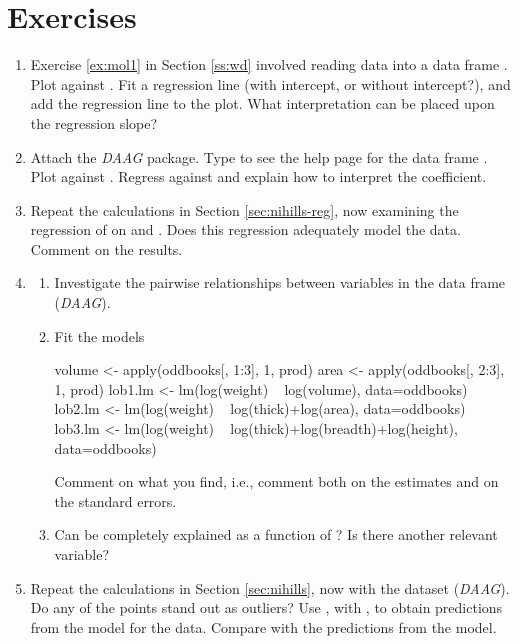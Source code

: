 \section{Exercises}
\begin{enumerate}
\item Exercise \ref{ex:mol1} in Section \ref{ss:wd} involved reading
  data into a data frame .  Plot  against
  . Fit a regression line (with intercept, or without
  intercept?), and add the regression line to the plot.  What
  interpretation can be placed upon the regression
  slope?\label{ex1:mod}

\item  Attach the \textit{DAAG} package. Type
 to see the help page for the data frame
.  Plot  against
. Regress  against
 and explain how to interpret the coefficient.
\item Repeat the calculations in Section \ref{sec:nihills-reg}, now
examining the regression of  on  and .
Does this regression adequately model the data. Comment on the results.
\item
\begin{enumerate}
\item Investigate the pairwise relationships between variables in the
data frame  ({\em DAAG}).
\item Fit the models
  \begin{fullwidth}
\begin{Schunk}
\begin{Sinput}
volume <- apply(oddbooks[, 1:3], 1, prod)
area <- apply(oddbooks[, 2:3], 1, prod)
lob1.lm <- lm(log(weight) ~ log(volume), data=oddbooks)
lob2.lm <- lm(log(weight) ~ log(thick)+log(area), data=oddbooks)
lob3.lm <- lm(log(weight) ~ log(thick)+log(breadth)+log(height),
              data=oddbooks)
\end{Sinput}
\end{Schunk}
\end{fullwidth}
Comment on what you find, i.e., comment both on the estimates and on
the standard errors.
\item Can  be completely explained as a function of
?  Is there another relevant variable?
\end{enumerate}
\item Repeat the calculations in Section \ref{sec:nihills}, now
  with the dataset  (\textit{DAAG}).  Do any of
  the points stand out as outliers?  Use ,
  with , to obtain predictions from the
   model for the  data.  Compare with
  the predictions from the  model.


\end{enumerate}
